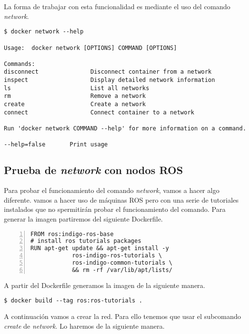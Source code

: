 	La forma de trabajar con esta funcionalidad es mediante el uso del comando \textit{\emph{network}}.
	
	\begin{lstlisting}[style=consola]
$ docker network --help

Usage:	docker network [OPTIONS] COMMAND [OPTIONS]

Commands:
disconnect               Disconnect container from a network
inspect                  Display detailed network information
ls                       List all networks
rm                       Remove a network
create                   Create a network
connect                  Connect container to a network

Run 'docker network COMMAND --help' for more information on a command.

--help=false       Print usage
	\end{lstlisting}
	
	\subsection{Prueba de \textit{network} con nodos ROS}


	Para probar el funcionamiento del comando \emph{network}, vamos a hacer algo diferente. vamos a hacer uso de máquinas ROS pero con una serie de tutoriales instalados que no spermitirán probar el funcionamiento del comando. Para generar la imagen partiremos del siguiente Dockerfile.

	\begin{lstlisting}[style=consola,numbers=left]
FROM ros:indigo-ros-base
# install ros tutorials packages
RUN apt-get update && apt-get install -y
            ros-indigo-ros-tutorials \
            ros-indigo-common-tutorials \
            && rm -rf /var/lib/apt/lists/
	\end{lstlisting}
	
	A partir del Dockerfile generamos la imagen de la siguiente manera.

	\begin{lstlisting}[style=consola]
$ docker build --tag ros:ros-tutorials .
	\end{lstlisting}

	A continuación vamos a crear la red. Para ello tenemos que usar el subcomando \emph{create} de \emph{network}. Lo haremos de la siguiente manera.

